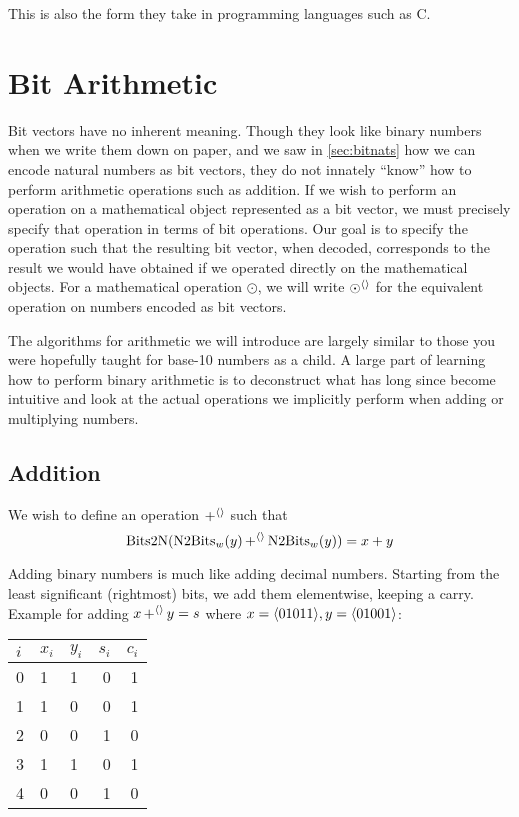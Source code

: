 This is also the form they take in programming languages such as C.

\section{Bit Arithmetic}
\label{sec:bit-arithmetic}

Bit vectors have no inherent meaning.  Though they look like binary
numbers when we write them down on paper, and we saw in
\cref{sec:bitnats} how we can encode natural numbers as bit vectors,
they do not innately ``know'' how to perform arithmetic operations
such as addition.  If we wish to perform an operation on a
mathematical object represented as a bit vector, we must precisely
specify that operation in terms of bit operations.  Our goal is to
specify the operation such that the resulting bit vector, when
decoded, corresponds to the result we would have obtained if we
operated directly on the mathematical objects.  For a mathematical
operation $\odot$, we will write $\operatorname{\odot^{\langle\rangle}}$ for the equivalent
operation on numbers encoded as bit vectors.

The algorithms for arithmetic we will introduce are largely similar to
those you were hopefully taught for base-10 numbers as a child.  A
large part of learning how to perform binary arithmetic is to
deconstruct what has long since become intuitive and look at the
actual operations we implicitly perform when adding or multiplying
numbers.

\subsection{Addition}
\label{sec:bit-addition}

We wish to define an operation $\operatorname{+^{\langle\rangle}}$ such that
\begin{equation}
  \mathrm{Bits2N}(\mathrm{N2Bits}_{w}(y)\operatorname{+^{\langle\rangle}}{}\mathrm{N2Bits}_{w}(y)) = x + y
\end{equation}

Adding binary numbers is much like adding decimal numbers.  Starting
from the least significant (rightmost) bits, we add them elementwise,
keeping a carry.  Example for adding $x\operatorname{+^{\langle\rangle}}{} y=s$ where
$x=\langle 01011 \rangle, y=\langle 01001 \rangle$:

\begin{center}
\begin{tabular}{l|llrr}
  $i$ & $x_{i}$ & $y_{i}$ & $s_{i}$ & $c_{i}$ \\\hline
  0 & 1 & 1 & 0 & 1 \\
  1 & 1 & 0 & 0 & 1 \\
  2 & 0 & 0 & 1 & 0 \\
  3 & 1 & 1 & 0 & 1 \\
  4 & 0 & 0 & 1 & 0
\end{tabular}
\end{center}

